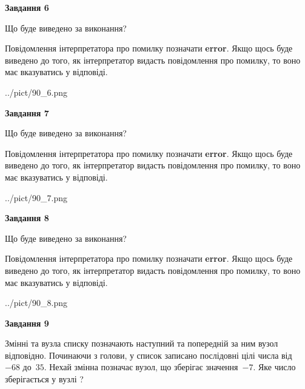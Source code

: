 \documentclass[12pt, ukrainian]{article}
\begin{document}
{\begin {large}
{\begin {center}\textbf{Завдання 6}\end {center}}\par
Що буде виведено за виконання?

Повідомлення інтерпретатора про помилку позначати \textbf{error}.
Якщо щось буде виведено до того, як інтерпретатор видасть повідомлення про помилку, 
то воно має вказуватись у відповіді. \par


\begin{center}
	{../pict/90_6.png}
\end{center}
\newpage

{\begin {center}\textbf{Завдання 7}\end {center}}\par
Що буде виведено за виконання?

Повідомлення інтерпретатора про помилку позначати \textbf{error}.
Якщо щось буде виведено до того, як інтерпретатор видасть повідомлення про помилку, 
то воно має вказуватись у відповіді. \par


\begin{center}
	{../pict/90_7.png}
\end{center}
\newpage

{\begin {center}\textbf{Завдання 8}\end {center}}\par
Що буде виведено за виконання?

Повідомлення інтерпретатора про помилку позначати \textbf{error}.
Якщо щось буде виведено до того, як інтерпретатор видасть повідомлення про помилку, 
то воно має вказуватись у відповіді. \par


\begin{center}
	{../pict/90_8.png}
\end{center}
\newpage

{\begin {center}\textbf{Завдання 9}\end {center}}\par
Змінні  та  вузла списку позначають наступний та попередній за ним вузол відповідно. Починаючи з голови, у список записано послідовні цілі числа від~$-68$ до~$35$. Нехай змінна  позначає вузол, що зберігає значення~$-7$.
Яке число зберігається у вузлі  ?\par
\newpage


\end{large}}
\end{document}
